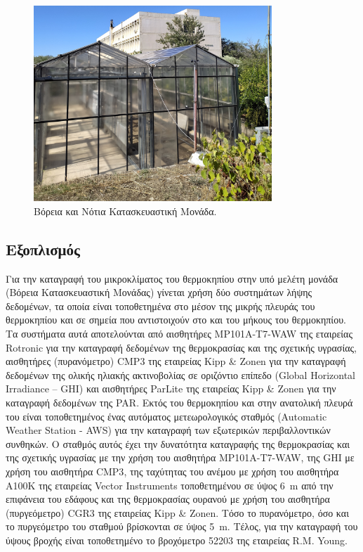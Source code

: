 \documentclass[12pt, a4paper]{report} %
\newcommand{\english}{\foreignlanguage{english}}
\begin{document}
\begin{figure}[ht]%
    \centering
    \includegraphics[width=0.8\textwidth]{Figures/Greenhouse.jpg}
    \caption{Βόρεια και Νότια Κατασκευαστική Μονάδα.}
    \label{fig_greenhouse_whole}
\end{figure}

\subsection{Εξοπλισμός}\label{sub_eksoplismos}
Για την καταγραφή του μικροκλίματος του θερμοκηπίου στην υπό μελέτη μονάδα (Βόρεια Κατασκευαστική Μονάδας) γίνεται 
χρήση δύο συστημάτων λήψης δεδομένων, τα οποία είναι τοποθετημένα στο μέσον της μικρής πλευράς του θερμοκηπίου και σε 
σημεία που αντιστοιχούν στο  και  του μήκους του θερμοκηπίου. Τα συστήματα αυτά αποτελούνται από 
αισθητήρες \english{MP101A-T7-WAW} της εταιρείας \english{Rotronic} για την καταγραφή δεδομένων της θερμοκρασίας και της 
σχετικής υγρασίας, αισθητήρες (πυρανόμετρο) \english{CMP3} της εταιρείας \english{Kipp \& Zonen} για την καταγραφή 
δεδομένων της ολικής ηλιακής ακτινοβολίας σε οριζόντιο επίπεδο (\english{Global Horizontal Irradiance – GHI}) και αισθητήρες 
\english{ParLite} της εταιρείας \english{Kipp \& Zonen} για την καταγραφή δεδομένων της \english{PAR}. Εκτός του θερμοκηπίου και στην ανατολική πλευρά του είναι 
τοποθετημένος ένας αυτόματος μετεωρολογικός σταθμός (\english{Automatic Weather Station - AWS}) για την καταγραφή των 
εξωτερικών περιβαλλοντικών συνθηκών. Ο σταθμός αυτός έχει την δυνατότητα καταγραφής της θερμοκρασίας και της σχετικής 
υγρασίας με την χρήση του αισθητήρα \english{MP101A-T7-WAW}, της \english{GHI} με χρήση 
του αισθητήρα \english{CMP3}, της ταχύτητας του ανέμου με χρήση του αισθητήρα \english{A100K} της εταιρείας 
\english{Vector Instruments} τοποθετημένου σε ύψος \SI{6}{\meter} από την επιφάνεια του εδάφους και της θερμοκρασίας ουρανού 
με χρήση του αισθητήρα (πυργεόμετρο) \english{CGR3} της εταιρείας \english{Kipp \& Zonen}. Τόσο το πυρανόμετρο, όσο και το 
πυργεόμετρο του σταθμού βρίσκονται σε ύψος \SI{5}{\meter}. Τέλος, για την καταγραφή του ύψους βροχής είναι τοποθετημένο το 
βροχόμετρο 52203 της εταιρείας \english{R.M. Young}.
\end{document}
